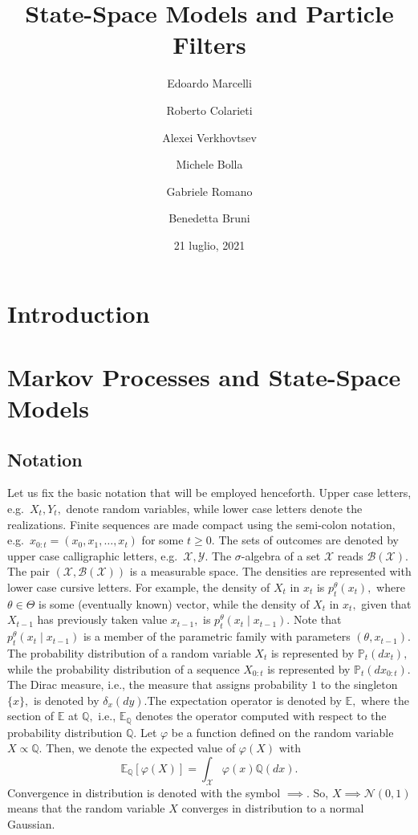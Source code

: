 \documentclass[
]{book}
\title{\Huge State-Space Models and Particle Filters}
\author{Edoardo Marcelli \and Roberto Colarieti \and Alexei
Verkhovtsev \and Michele Bolla \and Gabriele Romano \and Benedetta
Bruni}
\date{21 luglio, 2021}
\theoremstyle{break}
\theoremstyle{nonumberplain}
\begin{document}
\frontmatter
\maketitle

\mainmatter
\chapter*{Introduction}

\chapter{Markov Processes and State-Space Models}

\section{Notation}

Let us fix the basic notation that will be employed henceforth. Upper
case letters, e.g.~\(X_t, Y_t,\) denote random variables, while lower
case letters denote the realizations. Finite sequences are made compact
using the semi-colon notation, e.g.~\(x_{0:t}=(x_0, x_1, \dots, x_t)\)
for some \(t \geq 0.\) The sets of outcomes are denoted by upper case
calligraphic letters, e.g.~\(\mathcal{X}, \mathcal{Y}.\) The
\(\sigma\)-algebra of a set \(\mathcal{X}\) reads
\(\mathcal{B}(\mathcal{X}).\) The pair
\((\mathcal{X}, \mathcal{B}(\mathcal{X}))\) is a measurable space. The
densities are represented with lower case cursive letters. For example,
the density of \(X_t\) in \(x_t\) is \(p_t^\theta(x_t),\) where
\(\theta\in\Theta\) is some (eventually known) vector, while the density
of \(X_t\) in \(x_t,\) given that \(X_{t-1}\) has previously taken value
\(x_{t-1},\) is \(p_t^\theta(x_t\mid x_{t-1}).\) Note that
\(p_t^\theta(x_t\mid x_{t-1})\) is a member of the parametric family
with parameters \((\theta, x_{t-1})\). The probability distribution of a
random variable \(X_t\) is represented by \(\mathbb{P}_t(dx_t),\) while
the probability distribution of a sequence \(X_{0:t}\) is represented by
\(\mathbb{P}_t(dx_{0:t}).\) The Dirac measure, i.e., the measure that
assigns probability \(1\) to the singleton \(\{x\},\) is denoted by
\(\delta_x(dy)\).The expectation operator is denoted by \(\mathbb{E},\)
where the section of \(\mathbb{E}\) at \(\mathbb{Q},\) i.e.,
\(\mathbb{E}_{\mathbb{Q}}\) denotes the operator computed with respect
to the probability distribution \(\mathbb{Q}.\) Let \(\varphi\) be a
function defined on the random variable \(X\propto\mathbb{Q}.\) Then, we
denote the expected value of \(\varphi(X)\) with \[
    \mathbb{E}_{\mathbb{Q}}[\varphi(X)]=
    \int_{\mathcal{X}}\varphi(x)\mathbb{Q}(dx).
\] Convergence in distribution is denoted with the symbol \(\implies.\)
So, \(X\implies\mathcal N(0,1)\) means that the random variable \(X\)
converges in distribution to a normal Gaussian.
\end{document}
